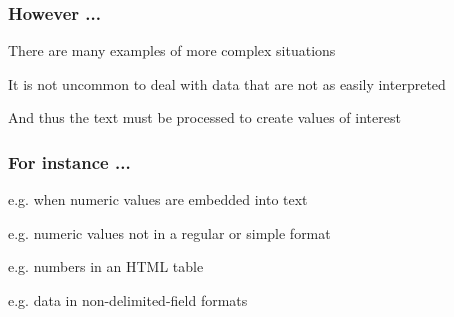 \documentclass[12pt]{beamer}\usepackage[]{graphicx}\usepackage[]{color}
\begin{document}

\begin{frame}
\frametitle{However ...}

\bbi
  \item There are many examples of more complex situations
  \item It is not uncommon to deal with data that are not as easily interpreted
  \item And thus the text must be processed to create values of interest
\ei

\end{frame}


\begin{frame}
\frametitle{For instance ...}

\bi
  \item e.g. when numeric values are embedded into text
  \item e.g. numeric values not in a regular or simple format
  \item e.g. numbers in an HTML table
  \item e.g. data in non-delimited-field formats 
\ei

\end{frame}


\begin{frame}
\begin{center}
\Huge{}
\end{center}
\end{frame}

\end{document}

